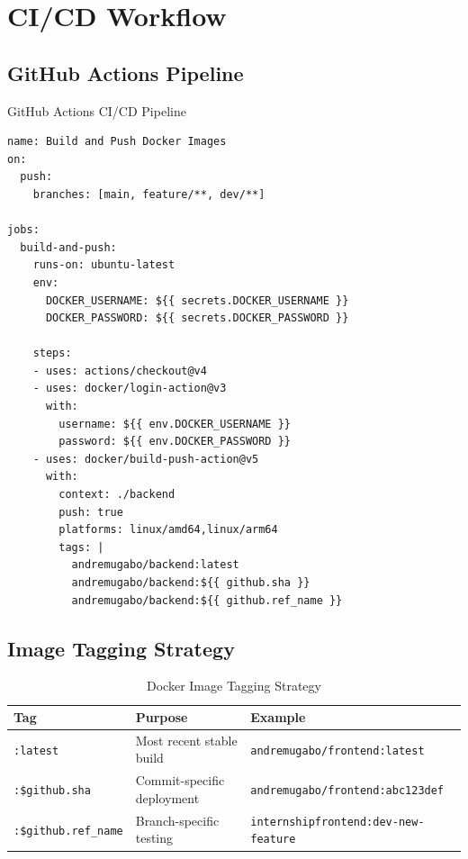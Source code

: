 \documentclass[12pt]{article}
\begin{document}
\section{CI/CD Workflow}

\subsection{GitHub Actions Pipeline}
\begin{codebox}{GitHub Actions CI/CD Pipeline}
\begin{lstlisting}
name: Build and Push Docker Images
on:
  push:
    branches: [main, feature/**, dev/**]

jobs:
  build-and-push:
    runs-on: ubuntu-latest
    env:
      DOCKER_USERNAME: ${{ secrets.DOCKER_USERNAME }}
      DOCKER_PASSWORD: ${{ secrets.DOCKER_PASSWORD }}
    
    steps:
    - uses: actions/checkout@v4
    - uses: docker/login-action@v3
      with:
        username: ${{ env.DOCKER_USERNAME }}
        password: ${{ env.DOCKER_PASSWORD }}
    - uses: docker/build-push-action@v5
      with:
        context: ./backend
        push: true
        platforms: linux/amd64,linux/arm64
        tags: |
          andremugabo/backend:latest
          andremugabo/backend:${{ github.sha }}
          andremugabo/backend:${{ github.ref_name }}
\end{lstlisting}
\end{codebox}

\subsection{Image Tagging Strategy}
\begin{table}[ht!]
\centering
\begin{tabular}{|p{3cm}|p{5cm}|>{\raggedright\arraybackslash}p{7cm}|}
\hline
\rowcolor{lightblue}
\textbf{Tag} & \textbf{Purpose} & \textbf{Example} \\
\hline
\texttt{:latest} & Most recent stable build & \texttt{andremugabo/frontend:latest} \\
\texttt{:{\footnotesize\$github.sha}} & Commit-specific deployment & \texttt{andremugabo/frontend:abc123def} \\
\texttt{:{\footnotesize\$github.ref\_name}} & Branch-specific testing & \texttt{internshipfrontend:dev-new-feature} \\
\hline
\end{tabular}
\caption{Docker Image Tagging Strategy}
\end{table}
\end{document}
